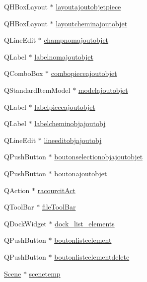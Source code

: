 \begin{DoxyCompactItemize}
Q\+H\+Box\+Layout $\ast$ \hyperlink{class_main_window_aaac8668d8fd7e507bac5c55d46512961}{layoutajoutobjetpiece}
\item 
Q\+H\+Box\+Layout $\ast$ \hyperlink{class_main_window_a48f194c81f0243edf86f3514a2c5056e}{layoutcheminajoutobjet}
\item 
Q\+Line\+Edit $\ast$ \hyperlink{class_main_window_a7deed257fbf9b55e24313b7026170aef}{champnomajoutobjet}
\item 
Q\+Label $\ast$ \hyperlink{class_main_window_a89a46805d840b83d61cde770a96626b8}{labelnomajoutobjet}
\item 
Q\+Combo\+Box $\ast$ \hyperlink{class_main_window_acee7fc52e6b8a7d86b363c0704e6a039}{combopieceajoutobjet}
\item 
Q\+Standard\+Item\+Model $\ast$ \hyperlink{class_main_window_abaf343df783ca19135463902b101a832}{modelajoutobjet}
\item 
Q\+Label $\ast$ \hyperlink{class_main_window_a445babe88ced015f57efc47fb092b2c2}{labelpieceajoutobjet}
\item 
Q\+Label $\ast$ \hyperlink{class_main_window_a4ce532cb101fc4b51f4842e492004a18}{labelcheminobjajoutobj}
\item 
Q\+Line\+Edit $\ast$ \hyperlink{class_main_window_aa760c44de1dda1a9683b3f2c29a8251a}{lineeditobjajoutobj}
\item 
Q\+Push\+Button $\ast$ \hyperlink{class_main_window_a15efafe52bb0d007aeedebbb9689a3af}{boutonselectionobjajoutobjet}
\item 
Q\+Push\+Button $\ast$ \hyperlink{class_main_window_a3371555c180ede0e55ea11a1ce1c9ae9}{boutonajoutobjet}
\item 
Q\+Action $\ast$ \hyperlink{class_main_window_a5abf7bab9a2c85168545220c9984fdfe}{racourcit\+Act}
\item 
Q\+Tool\+Bar $\ast$ \hyperlink{class_main_window_a0a352c6d66b7a080fcf558874a7e51d4}{file\+Tool\+Bar}
\item 
Q\+Dock\+Widget $\ast$ \hyperlink{class_main_window_ab0e654c3c8f22ae05433da58c112f155}{dock\+\_\+list\+\_\+elements}
\item 
Q\+Push\+Button $\ast$ \hyperlink{class_main_window_af87ab6bb1e48500cc732286cc98b990e}{boutonlisteelement}
\item 
Q\+Push\+Button $\ast$ \hyperlink{class_main_window_a0300f02a442c333e918e229817b27ef2}{boutonlisteelementdelete}
\item 
\hyperlink{class_scene}{Scene} $\ast$ \hyperlink{class_main_window_ab3b59f5d30eaedb1281da2b817c17fdf}{scenetemp}
\item 

\end{DoxyCompactItemize}
